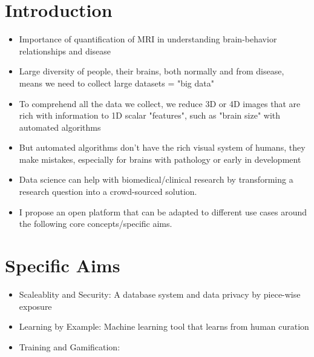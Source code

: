 \section{Introduction}
\begin{itemize}
\item Importance of quantification of MRI in understanding brain-behavior relationships and disease
\item Large diversity of people, their brains, both normally and from disease, means we need to collect large datasets = "big data"
\item To comprehend all the data we collect, we reduce 3D or 4D images that are rich with information to 1D scalar "features", such as "brain size" with automated algorithms
\item But automated algorithms don't have the rich visual system of humans, they make mistakes, especially for brains with pathology or early in development
\item Data science can help with biomedical/clinical research by transforming a research question into a crowd-sourced solution. 
\item I propose an open platform that can be adapted to different use cases around the following core concepts/specific aims.
\end{itemize}

\section{Specific Aims}
\begin{itemize}
\item Scaleablity and Security: A database system and data privacy by piece-wise exposure
\item Learning by Example: Machine learning tool that learns from human curation
\item Training and Gamification: 
\end{itemize}